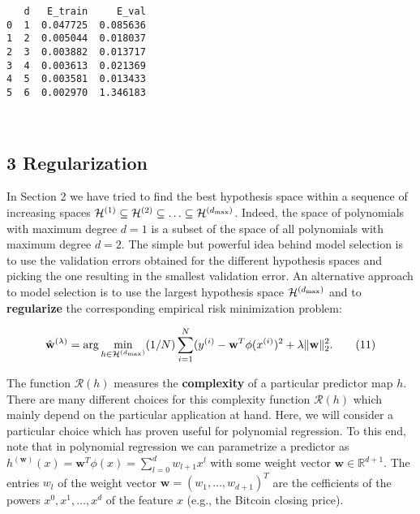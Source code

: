 \documentclass[11pt]{article}
\begin{document}
    
    \begin{verbatim}
   d   E_train     E_val
0  1  0.047725  0.085636
1  2  0.005044  0.018037
2  3  0.003882  0.013717
3  4  0.003613  0.021369
4  5  0.003581  0.013433
5  6  0.002970  1.346183
    \end{verbatim}

    
    \begin{center}
    \end{center}
    { \hspace*{\fill} \\}
    
    \subsection{3 Regularization}\label{regularization}

In Section 2 we have tried to find the best hypothesis space within a
sequence of increasing spaces
\(\mathcal{H}^{(1)} \subseteq \mathcal{H}^{(2)} \subseteq \ldots \subseteq \mathcal{H}^{(d_{\rm max})}\).
Indeed, the space of polynomials with maximum degree \(d=1\) is a subset
of the space of all polynomials with maximum degree \(d=2\). The simple
but powerful idea behind model selection is to use the validation errors
obtained for the different hypothesis spaces and picking the one
resulting in the smallest validation error. An alternative approach to
model selection is to use the largest hypothesis space
\(\mathcal{H}^{(d_{\rm max})}\) and to \textbf{regularize} the
corresponding empirical risk minimization problem:

\begin{equation}
\hat{\mathbf{w}}^{(\lambda)} = {\rm arg} \min\limits_{h \in \mathcal{H}^{(d_{\rm max})}} (1/N) \sum_{i=1}^{N} (y^{(i)} - \mathbf{w}^{T} \phi(x^{(i)} )^{2}+\lambda \|\mathbf{w}\|^{2}_{2}. 
\label{eq11}
\tag{11}
\end{equation}

The function \(\mathcal{R}(h)\) measures the \textbf{complexity} of a
particular predictor map \(h\). There are many different choices for
this complexity function \(\mathcal{R}(h)\) which mainly depend on the
particular application at hand. Here, we will consider a particular
choice which has proven useful for polynomial regression. To this end,
note that in polynomial regression we can parametrize a predictor as
\(h^{(\mathbf{w})}(x)= \mathbf{w}^{T} \phi(x) = \sum_{l=0}^{d} w_{l+1} x^{l}\)
with some weight vector \(\mathbf{w} \in \mathbb{R}^{d+1}\). The entries
\(w_{l}\) of the weight vector \(\mathbf{w}=(w_{1},\ldots,w_{d+1})^{T}\)
are the cefficients of the powers \(x^{0},x^{1},\ldots,x^{d}\) of the
feature \(x\) (e.g., the Bitcoin closing price).
\end{document}
